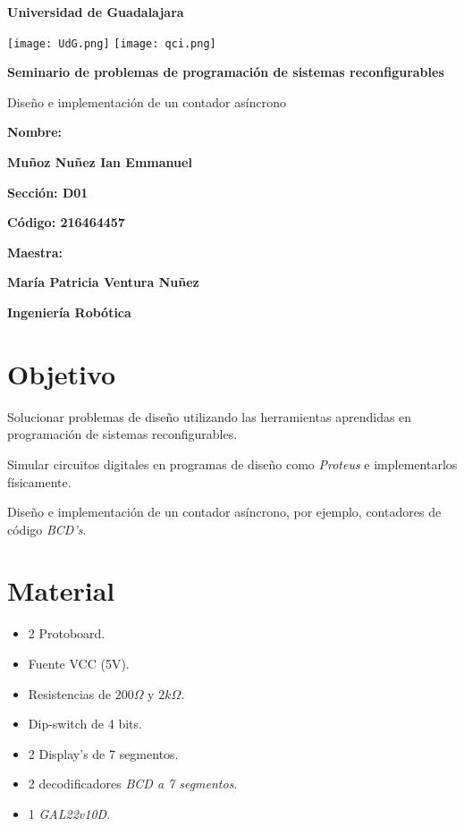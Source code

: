\documentclass[12pt, oneside, openany]{article}
\begin{document}
\begin{titlepage}
    \centering
    {\bfseries\LARGE Universidad de Guadalajara \par}
    \vfill
    {
        \texttt{[image: UdG.png]}
        \texttt{[image: qci.png]}
        \par
    }
    \vfill
    {\bfseries\LARGE Seminario de problemas de programación de sistemas reconfigurables \par}
    \vfill
    {\LARGE Diseño e implementación de un contador asíncrono \par}
    \vfill
    {\bfseries\LARGE Nombre: \par}
    \vfill
    {\bfseries\LARGE Muñoz Nuñez Ian Emmanuel \par}
    \vfill
    {\bfseries\LARGE Sección: D01 \par}
    \vfill
    {\bfseries\LARGE Código: 216464457 \par}
    \vfill
    {\bfseries\LARGE Maestra: \par}
    \vfill
    {\bfseries\LARGE María Patricia Ventura Nuñez \par}
    \vfill
    {\bfseries\LARGE Ingeniería Robótica \par}
\end{titlepage}


\newpage
\section{Objetivo}
{\sffamily\large
    \hspace{0.5cm} Solucionar problemas de diseño utilizando las herramientas aprendidas
    en programación de sistemas reconfigurables.

    \hspace{0.5cm} Simular circuitos digitales en programas de diseño como
    \emph{Proteus\textregistered} e implementarlos físicamente.

    \hspace{0.5cm} Diseño e implementación de un contador asíncrono, por ejemplo,
    contadores de código \emph{BCD's}.
}

\section{Material}
{\sffamily\large
    \renewcommand{\labelitemi}{$\bullet$}
    \begin{itemize}
        \item 2 Protoboard.
        \item Fuente VCC (5V).
        \item Resistencias de $200\Omega$ y $2k\Omega$.
        \item Dip-switch de 4 bits.
        \item 2 Display's de 7 segmentos.
        \item 2 decodificadores \emph{BCD a 7 segmentos}.
        \item 1 \emph{GAL22v10D}.
    \end{itemize}
}
\end{document}
